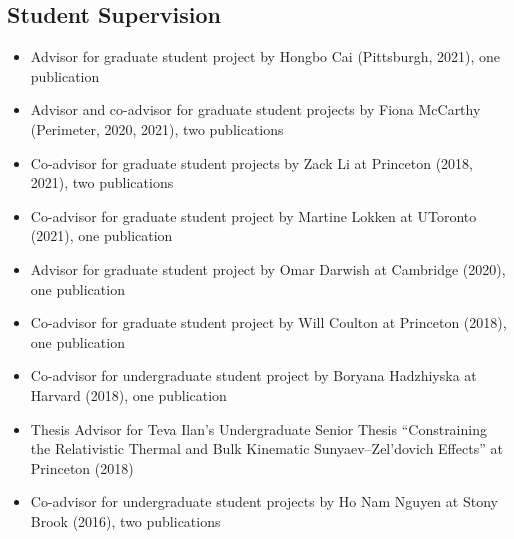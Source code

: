 \documentclass[11pt,margin]{res}
\begin{document}
\begin{resume}
\section{Student Supervision}
\begin{itemize}
\item Advisor for graduate student project by Hongbo Cai (Pittsburgh, 2021), one publication
\item Advisor and co-advisor for graduate student projects by Fiona McCarthy (Perimeter, 2020, 2021), two publications
\item Co-advisor for graduate student projects by Zack Li at Princeton (2018, 2021), two publications
\item Co-advisor for graduate student project by Martine Lokken at UToronto (2021), one publication
\item Advisor for graduate student project by Omar Darwish at Cambridge (2020), one publication
\item Co-advisor for graduate student project by Will Coulton at Princeton (2018), one publication
\item Co-advisor for undergraduate student project by Boryana Hadzhiyska at Harvard (2018), one publication
\item Thesis Advisor for Teva Ilan's Undergraduate Senior Thesis ``Constraining the Relativistic Thermal and Bulk
  Kinematic Sunyaev–Zel’dovich Effects'' at Princeton (2018)
\item Co-advisor for undergraduate student projects by Ho Nam Nguyen at Stony Brook (2016), two publications
\end{itemize}



\end{resume}
\end{document}
